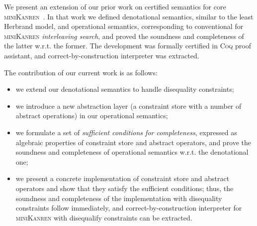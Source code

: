 \documentclass[submission,copyright,creativecommons]{eptcs}
\newcommand{\reprfun}{\mathfrak{f}}
\begin{document}

We present an extension of our prior work on certified semantics for core \textsc{miniKanren}~\cite{CertifiedSemantics}. In that work we
defined denotational semantics, similar to the least Herbrand model, and operational semantics, corresponding to conventional for \textsc{miniKanren}
\emph{interleaving search}, and proved the soundness and completeness of the latter w.r.t. the former. The development was formally certified in
\textsc{Coq} proof assistant, and correct-by-construction interpreter was extracted.

The contribution of our current work is as follows:

\begin{itemize}
\item we extend our denotational semantics to handle disequality constraints;
\item we introduce a new abstraction layer (a constraint store with a number of abstract operations) in our operational semantics;
\item we formulate a set of \emph{sufficient conditions for completeness}, expressed as algebraic properties of constraint store and
  abstract operators, and prove the soundness and completeness of operational semantics w.r.t. the denotational one;
\item we present a concrete implementation of constraint store and abstract operators and show that they satisfy the
  sufficient conditions; thus, the soundness and completeness of the implementation with disequality constraints follow
  immediately, and correct-by-construction interpreter for \textsc{miniKanren} with disequalify constraints
  can be extracted.
\end{itemize}

\end{document}
